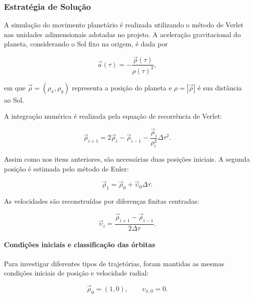 \documentclass[12pt,a4paper]{article}
\begin{document}
\subsubsection{Estratégia de Solução}

A simulação do movimento planetário é realizada utilizando o método de Verlet nas unidades adimensionais adotadas no projeto. A aceleração gravitacional do planeta, considerando o Sol fixo na origem, é dada por

\begin{equation}
    \vec{a}(\tau)=-\frac{\vec{\rho}(\tau)}{\rho(\tau)^3},
\end{equation}

em que $\vec{\rho}=(\rho_x,\rho_y)$ representa a posição do planeta e $\rho=|\vec{\rho}|$ é sua distância ao Sol.

A integração numérica é realizada pela equação de recorrência de Verlet:

\begin{equation}
    \vec{\rho}_{i+1}
    =
    2\vec{\rho}_i-\vec{\rho}_{i-1}
    -
    \frac{\vec{\rho}_i}{\rho_i^3}\Delta\tau^2.
\end{equation}

Assim como nos itens anteriores, são necessárias duas posições iniciais. A segunda posição é estimada pelo método de Euler:

\begin{equation}
    \vec{\rho}_1=
    \vec{\rho}_0+\vec{\upsilon}_0\Delta\tau.
\end{equation}

As velocidades são reconstruídas por diferenças finitas centradas:

\begin{equation}
    \vec{\upsilon}_i=
    \frac{\vec{\rho}_{i+1}-\vec{\rho}_{i-1}}
    {2\Delta\tau}.
\end{equation}

\paragraph{Condições iniciais e classificação das órbitas}

Para investigar diferentes tipos de trajetórias, foram mantidas as mesmas condições iniciais de posição e velocidade radial:

\begin{equation}
    \vec{\rho}_0=(1,0),
    \qquad
    \upsilon_{x,0}=0.
\end{equation}
\end{document}
